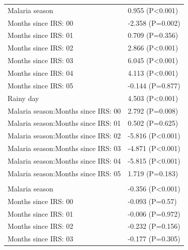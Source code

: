 \documentclass[]{article}
\begin{document}
\begin{longtable}[t]{ll}
\hspace{1em}Malaria season & 0.955 (P<0.001)\\
\hspace{1em}Months since IRS: 00 & -2.358 (P=0.002)\\
\hspace{1em}Months since IRS: 01 & 0.709 (P=0.356)\\
\hspace{1em}Months since IRS: 02 & 2.866 (P<0.001)\\
\hspace{1em}Months since IRS: 03 & 6.045 (P<0.001)\\
\hspace{1em}Months since IRS: 04 & 4.113 (P<0.001)\\
\hspace{1em}Months since IRS: 05 & -0.144 (P=0.877)\\
\hspace{1em}Rainy day & 4.503 (P<0.001)\\
\hspace{1em}Malaria season:Months since IRS: 00 & 2.792 (P=0.008)\\
\hspace{1em}Malaria season:Months since IRS: 01 & 0.502 (P=0.625)\\
\hspace{1em}Malaria season:Months since IRS: 02 & -5.816 (P<0.001)\\
\hspace{1em}Malaria season:Months since IRS: 03 & -4.871 (P<0.001)\\
\hspace{1em}Malaria season:Months since IRS: 04 & -5.815 (P<0.001)\\
\hspace{1em}Malaria season:Months since IRS: 05 & 1.719 (P=0.183)\\
\addlinespace[1.5em]
\multicolumn{2}{l}{\textbf{Temporary field worker}}\\
\hspace{1em}Malaria season & -0.356 (P<0.001)\\
\hspace{1em}Months since IRS: 00 & -0.093 (P=0.57)\\
\hspace{1em}Months since IRS: 01 & -0.006 (P=0.972)\\
\hspace{1em}Months since IRS: 02 & -0.232 (P=0.156)\\
\hspace{1em}Months since IRS: 03 & -0.177 (P=0.305)\\

\end{longtable}
\end{document}
